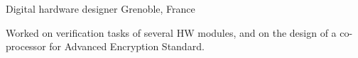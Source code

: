 
\begin{cventries}
\vspace{-4mm}

\cventry
{}
{\vspace{-8mm}Digital hardware designer } %
{\vspace{-8mm}Grenoble, France} %
{} %
{
\begin{cvitems}
Worked on verification tasks of several HW modules, and on the design of a 
co-processor for Advanced Encryption Standard.
\end{cvitems}
}
\vspace{-4mm}


\end{cventries}
